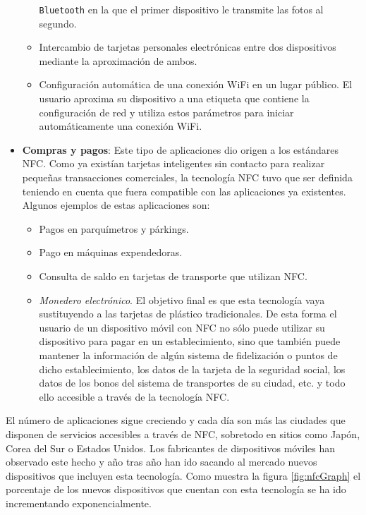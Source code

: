 \begin{itemize}
\begin{itemize}
  \texttt{Bluetooth} en la que el primer dispositivo le transmite las fotos al
  segundo.
  \item Intercambio de tarjetas personales electrónicas entre dos dispositivos
  mediante la aproximación de ambos.
  \item Configuración automática de una conexión \acs{WiFi} en un lugar
  público. El usuario aproxima su dispositivo a una etiqueta que contiene la
  configuración de red y utiliza estos parámetros para iniciar automáticamente
  una conexión \acs{WiFi}.
  \end{itemize}
\item \textbf{Compras y pagos}:
Este tipo de aplicaciones dio origen a los estándares \acs{NFC}. Como ya
existían tarjetas inteligentes sin contacto para realizar pequeñas
transacciones comerciales, la tecnología \acs{NFC} tuvo que ser definida
teniendo en cuenta que fuera compatible con las aplicaciones ya existentes.
Algunos ejemplos de estas aplicaciones son:
  \begin{itemize}
  \item Pagos en parquímetros y párkings.
  \item Pago en máquinas expendedoras.
  \item Consulta de saldo en tarjetas de transporte que utilizan \acs{NFC}.
  \item \emph{Monedero electrónico}. El objetivo final es que esta tecnología
  vaya sustituyendo a las tarjetas de plástico tradicionales. De esta forma
  el usuario de un dispositivo móvil con \acs{NFC} no sólo puede utilizar su
  dispositivo para pagar en un establecimiento, sino que también puede
  mantener la información de algún sistema de fidelización o puntos de dicho
  establecimiento, los datos de la tarjeta de la seguridad social, los datos
  de los bonos del sistema de transportes de su ciudad, etc. y todo ello
  accesible a través de la tecnología \acs{NFC}.
  \end{itemize}
\end{itemize}

El número de aplicaciones sigue creciendo y cada día son más las ciudades
que disponen de servicios accesibles a través de \acs{NFC}, sobretodo en
sitios como Japón, Corea del Sur o Estados Unidos. Los fabricantes de
dispositivos móviles han observado este hecho y año tras año han ido
sacando al mercado nuevos dispositivos que incluyen esta tecnología.
Como muestra la figura \ref{fig:nfcGraph} el porcentaje de los nuevos
dispositivos que cuentan con esta tecnología se ha ido incrementando
exponencialmente.

